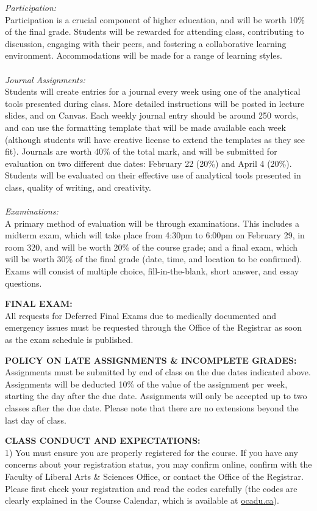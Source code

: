 \documentclass[10pt]{article}
\begin{document}
\textit{Participation:}\\ 
Participation is a crucial component of higher education, and will be worth 10\% of the final grade. Students will be rewarded for attending class, contributing to discussion, engaging with their peers, and fostering a collaborative learning environment. Accommodations will be made for a range of learning styles.\\\\
\textit{Journal Assignments:}\\
Students will create entries for a journal every week using one of the analytical tools presented during class. More detailed instructions will be posted in lecture slides, and on Canvas. Each weekly journal entry should be around 250 words, and can use the formatting template that will be made available each week (although students will have creative license to extend the templates as they see fit). Journals are worth 40\% of the total mark, and will be submitted for evaluation on two different due dates: February 22 (20\%) and April 4 (20\%). Students will be evaluated on their effective use of analytical tools presented in class, quality of writing, and creativity.\\\\
\textit{Examinations:}\\ 
A primary method of evaluation will be through examinations. This includes a midterm exam, which will take place from 4:30pm to 6:00pm on February 29, in room 320, and will be worth 20\% of the course grade; and a final exam, which will be worth 30\% of the final grade (date, time, and location to be confirmed). Exams will consist of multiple choice, fill-in-the-blank, short answer, and essay questions. 

\textbf{FINAL EXAM:}\\
All requests for Deferred Final Exams due to medically documented and emergency issues must be requested through the Office of the Registrar as soon as the exam schedule is published.

\textbf{POLICY ON LATE ASSIGNMENTS \& INCOMPLETE GRADES:}\\
Assignments must be submitted by end of class on the due dates indicated above. Assignments will be deducted 10\% of the value of the assignment per week, starting the day after the due date. Assignments will only be accepted up to two classes after the due date. Please note that there are no extensions beyond the last day of class.

\textbf{CLASS CONDUCT AND EXPECTATIONS:}\\
1) You must ensure you are properly registered for the course. If you have any concerns about your registration status, you may confirm online, confirm with the Faculty of Liberal Arts \& Sciences Office, or contact the Office of the Registrar. Please first check your registration and read the codes carefully (the codes are clearly explained in the Course Calendar, which is available at \href{http://www.ocadu.ca/services/records-and-registration/course-calendar-and-registration.htm}{ocadu.ca}).
\end{document}
